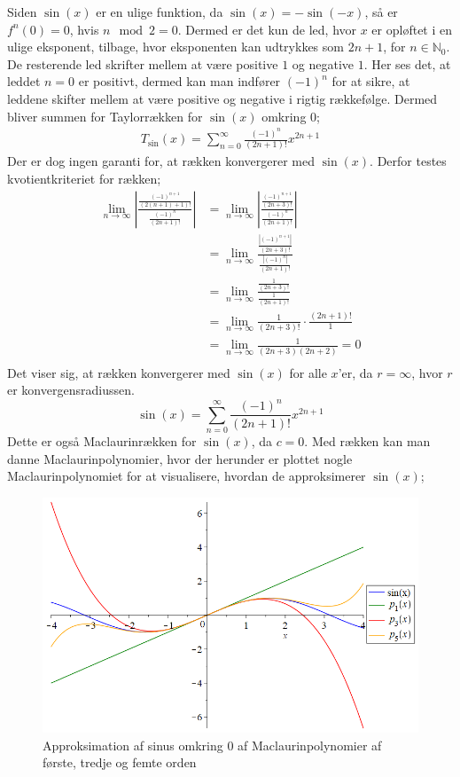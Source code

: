Siden $\sin(x)$ er en ulige funktion, da $\sin(x)=-\sin(-x)$, så er $f^{n}(0)=0$, hvis $n \mod 2=0$. Dermed er det kun de led, hvor $x$ er opløftet i en ulige eksponent, tilbage, hvor eksponenten kan udtrykkes som $2n+1$, for $n\in \mathbb{N}_0$. De resterende led skrifter mellem at være positive $1$ og negative $1$. Her ses det, at leddet $n=0$ er positivt, dermed kan man indfører $(-1)^n$ for at sikre, at leddene skifter mellem at være positive og negative i rigtig rækkefølge. Dermed bliver summen for Taylorrækken for $\sin(x)$ omkring $0$;
\begin{align*}
T_{\sin}(x)=\sum_{n=0}^{\infty} \frac{(-1)^n}{(2n+1)!}x^{2n+1}
\end{align*}
Der er dog ingen garanti for, at rækken konvergerer med $\sin(x)$. Derfor testes kvotientkriteriet for rækken;
\begin{align*}
\lim\limits_{n \to \infty}
\left\lvert
\frac{\frac{(-1)^{n+1}}{(2(n+1)+1)!}}
{\frac{(-1)^n}{(2n+1)!}} 
\right\lvert
&=
\lim\limits_{n \to \infty}
\left\lvert
\frac{\frac{(-1)^{n+1}}{(2n+3)!}}
{\frac{(-1)^n}{(2n+1)!}}
\right\lvert 
\\
&=
\lim\limits_{n \to \infty}
\frac{\frac{\left\lvert (-1)^{n+1} \right\lvert }{(2n+3)!}}
{\frac{\left\lvert (-1)^n \right\lvert }{(2n+1)!}}
\\
&=
\lim\limits_{n \to \infty}
\frac{\frac{1}{(2n+3)!}}
{\frac{1}{(2n+1)!} }
\\
&=
\lim\limits_{n \to \infty}
\frac{1}{(2n+3)!}
\cdot
\frac{(2n+1)!}{1}
\\
&=
\lim\limits_{n \to \infty}
\frac{1}{(2n+3)(2n+2)}
=0 \\
\end{align*}
Det viser sig, at rækken konvergerer med $\sin(x)$ for alle $x$'er, da $r=\infty$, hvor $r$ er konvergensradiussen.
\begin{equation}\label{eq:sinrække}
\sin(x)=\sum_{n=0}^{\infty} \frac{(-1)^n}{(2n+1)!}x^{2n+1}
\end{equation}
Dette er også Maclaurinrækken for $\sin(x)$, da $c=0$. Med rækken kan man danne Maclaurinpolynomier, hvor der herunder er plottet nogle Maclaurinpolynomiet for at visualisere, hvordan de approksimerer $\sin(x)$;
\begin{figure}[H]
	\centering
	\includegraphics[scale=0.4]{fig/img/taylor_sin}
	\caption{Approksimation af sinus omkring 0 af Maclaurinpolynomier af første, tredje og femte orden}
 	\label{fig:taylor_sin}
\end{figure}
